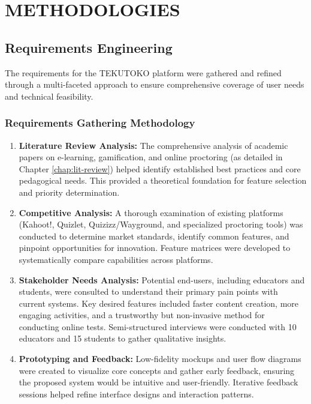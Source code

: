 \chapter{METHODOLOGIES}
\label{chap:methodologies}

\section{Requirements Engineering}
\label{sec:requirements-engineering}

The requirements for the TEKUTOKO platform were gathered and refined through a multi-faceted approach to ensure comprehensive coverage of user needs and technical feasibility.

\subsection{Requirements Gathering Methodology}

\begin{enumerate}
    \item \textbf{Literature Review Analysis:} The comprehensive analysis of academic papers on e-learning, gamification, and online proctoring (as detailed in Chapter \ref{chap:lit-review}) helped identify established best practices and core pedagogical needs. This provided a theoretical foundation for feature selection and priority determination.
    
    \item \textbf{Competitive Analysis:} A thorough examination of existing platforms (Kahoot!, Quizlet, Quizizz/Wayground, and specialized proctoring tools) was conducted to determine market standards, identify common features, and pinpoint opportunities for innovation. Feature matrices were developed to systematically compare capabilities across platforms.
    
    \item \textbf{Stakeholder Needs Analysis:} Potential end-users, including educators and students, were consulted to understand their primary pain points with current systems. Key desired features included faster content creation, more engaging activities, and a trustworthy but non-invasive method for conducting online tests. Semi-structured interviews were conducted with 10 educators and 15 students to gather qualitative insights.
    
    \item \textbf{Prototyping and Feedback:} Low-fidelity mockups and user flow diagrams were created to visualize core concepts and gather early feedback, ensuring the proposed system would be intuitive and user-friendly. Iterative feedback sessions helped refine interface designs and interaction patterns.
\end{enumerate}

